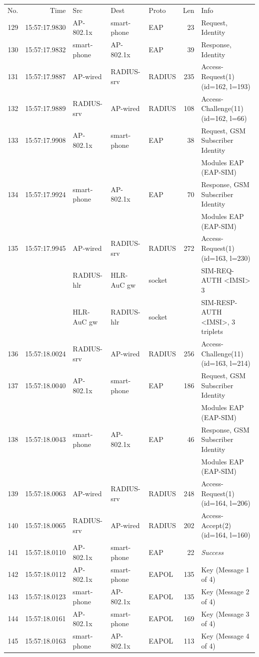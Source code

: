 \documentclass[12pt,a4paper,english]{tutthesis}
\begin{document}
\begin{otherlanguage}{english}
\scriptsize
\begin{center}
\begin{tabular}{rrlllrl}
No. & Time & Src & Dest & Proto & Len & Info\\
129 & 15:57:17.9830 & AP-802.1x & smartphone & EAP & 23 & Request, Identity\\
130 & 15:57:17.9832 & smartphone & AP-802.1x & EAP & 39 & Response, Identity\\
131 & 15:57:17.9887 & AP-wired & RADIUS-srv & RADIUS & 235 & Access-Request(1) (id=162, l=193)\\
132 & 15:57:17.9889 & RADIUS-srv & AP-wired & RADIUS & 108 & Access-Challenge(11) (id=162, l=66)\\
133 & 15:57:17.9908 & AP-802.1x & smartphone & EAP & 38 & Request, GSM Subscriber Identity\\
 &  &  &  &  &  & Modules EAP (EAP-SIM)\\
134 & 15:57:17.9924 & smartphone & AP-802.1x & EAP & 70 & Response, GSM Subscriber Identity\\
 &  &  &  &  &  & Modules EAP (EAP-SIM)\\
135 & 15:57:17.9945 & AP-wired & RADIUS-srv & RADIUS & 272 & Access-Request(1) (id=163, l=230)\\
 &  & RADIUS-hlr & HLR-AuC gw & socket &  & SIM-REQ-AUTH <IMSI> 3\\
 &  & HLR-AuC gw & RADIUS-hlr & socket &  & SIM-RESP-AUTH <IMSI>, 3 triplets\\
136 & 15:57:18.0024 & RADIUS-srv & AP-wired & RADIUS & 256 & Access-Challenge(11) (id=163, l=214)\\
137 & 15:57:18.0040 & AP-802.1x & smartphone & EAP & 186 & Request, GSM Subscriber Identity\\
 &  &  &  &  &  & Modules EAP (EAP-SIM)\\
138 & 15:57:18.0043 & smartphone & AP-802.1x & EAP & 46 & Response, GSM Subscriber Identity\\
 &  &  &  &  &  & Modules EAP (EAP-SIM)\\
139 & 15:57:18.0063 & AP-wired & RADIUS-srv & RADIUS & 248 & Access-Request(1) (id=164, l=206)\\
140 & 15:57:18.0065 & RADIUS-srv & AP-wired & RADIUS & 202 & Access-Accept(2) (id=164, l=160)\\
141 & 15:57:18.0110 & AP-802.1x & smartphone & EAP & 22 & \em{Success}\\
142 & 15:57:18.0112 & AP-802.1x & smartphone & EAPOL & 135 & Key (Message 1 of 4)\\
143 & 15:57:18.0123 & smartphone & AP-802.1x & EAPOL & 135 & Key (Message 2 of 4)\\
144 & 15:57:18.0161 & AP-802.1x & smartphone & EAPOL & 169 & Key (Message 3 of 4)\\
145 & 15:57:18.0163 & smartphone & AP-802.1x & EAPOL & 113 & Key (Message 4 of 4)\\
\end{tabular}
\end{center}
\normalsize





\end{otherlanguage}
\end{document}
